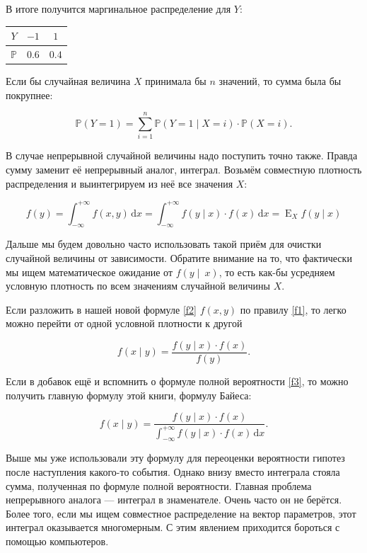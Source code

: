 \documentclass[12pt, a4paper, oneside]{extreport}
\DeclareMathOperator{\E}{\mathop{E}}
\def \mbb{\mathbb}
\def \PP{\mbb{P}}
\newcommand{\dx}[1]{\,\mathrm{d}#1} %
\theoremstyle{plain}              %
\theoremstyle{definition}         %
\begin{document}
 В итоге получится маргинальное распределение для $Y$: 

\begin{center}
\begin{tabular}{c|c|c}
$Y $ &  $-1$    &  $1$     \\ \hline
$\PP$&  	$0.6$   &  $0.4$   \\
\end{tabular}
\end{center}

Если бы случайная величина $X$ принимала бы $n$ значений, то сумма была бы покрупнее: 

\[
\PP(Y=1) = \sum_{i=1}^n \PP(Y = 1 \mid X = i) \cdot \PP(X = i).
\]

В случае непрерывной случайной величины надо поступить точно также. Правда сумму заменит её непрерывный аналог, интеграл. Возьмём совместную плотность распределения и выинтегрируем из неё все значения $X$:

\begin{equation}\label{f3}
f(y) = \int_{-\infty}^{+\infty} f(x,y) \dx{x} = \int_{-\infty}^{+\infty} f(y \mid x) \cdot f(x) \dx{x} = \E_{X} f(y \mid x)
\end{equation}

Дальше мы будем довольно часто использовать такой приём для очистки случайной величины от зависимости. Обратите внимание на то, что фактически мы ищем математическое ожидание от $f(y\mid~x)$, то есть как-бы усредняем условную плотность по всем значениям случайной величины $X$.

Если разложить в нашей новой формуле \eqref{f2} $f(x,y)$ по правилу \eqref{f1}, то легко можно перейти от одной условной плотности к другой

\begin{equation}
f(x \mid y) = \frac{ f(y \mid x) \cdot f(x)}{f(y)}.
\end{equation}

Если в добавок ещё и вспомнить о формуле полной вероятности \eqref{f3}, то можно получить главную формулу этой книги, формулу Байеса:

\[ f(x \mid y) = \frac{ f(y \mid x) \cdot f(x)}{\int_{-\infty}^{+\infty} f(y \mid x) \cdot f(x) \dx{x}}. \]

Выше мы уже использовали эту формулу для переоценки вероятности гипотез после наступления какого-то события. Однако внизу вместо интеграла стояла сумма, полученная по формуле полной вероятности.  Главная проблема непрерывного аналога --- интеграл в знаменателе. Очень часто он не берётся. Более того, если мы ищем совместное распределение на вектор параметров, этот интеграл оказывается многомерным. С этим явлением приходится бороться с помощью компьютеров.  
\end{document}
